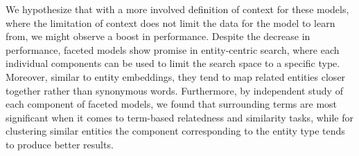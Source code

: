 We hypothesize that with a more involved definition of context for these models, where the limitation of context does not limit the data for the model to learn from, we might observe a boost in performance.
Despite the decrease in performance, faceted models show promise in entity-centric search, where each individual components can be used to limit the search space to a specific type. Moreover, similar to entity embeddings, they tend to map related entities closer together rather than synonymous words. Furthermore, by independent study of each component of faceted models, we found that surrounding terms are most significant when it comes to term-based relatedness and similarity tasks, while for clustering similar entities the component corresponding to the entity type tends to produce better results.

